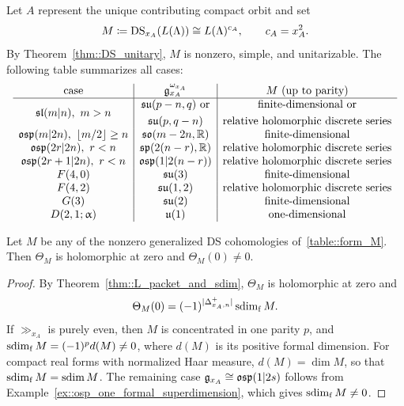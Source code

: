 Let $A$ represent the unique contributing compact orbit and set
\begin{equation}
M\coloneqq\operatorname{DS}_{x_A}(L(\Lambda))
\cong L(\Lambda)^{c_A},
\qquad c_A=x_A^2.
\end{equation}
By Theorem~\ref{thm::DS_unitary}, $M$ is nonzero, simple, and unitarizable. The following table summarizes all cases:
\begin{equation}\label{table::form_M}
\begin{array}{c|c|c}
\text{case}&{\mathfrak{g}}_{x_{A}}^{\omega_{x_{A}}}&M\text{ (up to parity)}\\ \hline
{\mathfrak{sl}}(m\vert n),\ m>n
&\begin{gathered}{\mathfrak{su}}(p-n,q)\text{ or}\\ {\mathfrak{su}}(p,q-n)\end{gathered}&\begin{gathered}\text{finite-dimensional or}\\ \text{relative holomorphic discrete series}\end{gathered}\\
{\mathfrak{osp}}(m\vert2n),\ \lfloor m/2\rfloor\geq n
&{\mathfrak{so}}(m-2n,{\mathbb R})&\text{finite-dimensional}\\
{\mathfrak{osp}}(2r\vert2n),\ r<n
&{\mathfrak{sp}}(2(n-r),{\mathbb R})&\text{relative holomorphic discrete series}\\
{\mathfrak{osp}}(2r+1\vert2n),\ r<n
&{\mathfrak{osp}}(1\vert2(n-r))&\text{relative holomorphic discrete series}\\
F(4,0)&{\mathfrak{su}}(3)&\text{finite-dimensional}\\
F(4,2)&{\mathfrak{su}}(1,2)&\text{relative holomorphic discrete series}\\
G(3)&{\mathfrak{su}}(2)&\text{finite-dimensional}\\
D(2,1;\upalpha)&\mathfrak u(1)&\text{one-dimensional}
\end{array}
\end{equation}

\begin{lemma}
\label{lemm::reduced_packet_nonvanishing}
Let $M$ be any of the nonzero generalized DS cohomologies of~\eqref{table::form_M}. Then $\Theta_M$ is holomorphic at zero and $\Theta_M(0)\neq0$.
\end{lemma}

\begin{proof}
By Theorem~\ref{thm::L_packet_and_sdim}, $\Theta_M$ is holomorphic at zero and
\begin{equation*}
\Theta_M(0)
=
(-1)^{|\Delta_{x_A,n}^+|}\operatorname{sdim}_{\mathrm f} M.
\end{equation*}
If $\gg_{x_A}$ is purely even, then $M$ is concentrated in one parity $p$, and $\operatorname{sdim}_{\mathrm f} M=(-1)^p d(M)\neq0$, where $d(M)$ is its positive formal dimension. For compact real forms with normalized Haar measure, $d(M)=\dim M$, so that $\operatorname{sdim}_{\mathrm f} M=\operatorname{sdim} M$. The remaining case ${\mathfrak{g}}_{x_A}\cong{\mathfrak{osp}}(1\vert2s)$ follows from Example~\ref{ex::osp_one_formal_superdimension}, which gives $\operatorname{sdim}_{\mathrm f} M\neq0$.
\end{proof}




